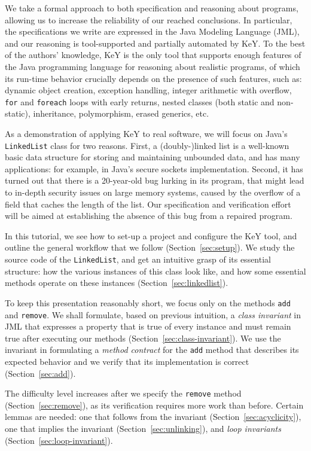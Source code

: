 \documentclass[runningheads]{llncs}
\begin{document}
We take a formal approach to both specification and reasoning about programs, allowing us to increase the reliability of our reached conclusions. In particular, the specifications we write are expressed in the Java Modeling Language (JML), and our reasoning is tool-supported and partially automated by KeY. To the best of the authors' knowledge, KeY is the only tool that supports enough features of the Java programming language for reasoning about realistic programs, of which its run-time behavior crucially depends on the presence of such features, such as: dynamic object creation, exception handling, integer arithmetic with overflow, \texttt{for} and \texttt{foreach} loops with early returns, nested classes (both static and non-static), inheritance, polymorphism, erased generics, etc.

As a demonstration of applying KeY to real software, we will focus on Java's \texttt{LinkedList} class for two reasons. First, a (doubly-)linked list is a well-known basic data structure for storing and maintaining unbounded data, and has many applications: for example, in Java's secure sockets implementation. Second, it has turned out that there is a 20-year-old bug lurking in its program, that might lead to in-depth security issues on large memory systems, caused by the overflow of a field that caches the length of the list. Our specification and verification effort will be aimed at establishing the absence of this bug from a repaired program.

In this tutorial, we see how to set-up a project and configure the KeY tool, and outline the general workflow that we follow (Section~\ref{sec:setup}). We study the source code of the \texttt{LinkedList}, and get an intuitive grasp of its essential structure: how the various instances of this class look like, and how some essential methods operate on these instances (Section~\ref{sec:linkedlist}).

To keep this presentation reasonably short, we focus only on the methods \texttt{add} and \texttt{remove}. We shall formulate, based on previous intuition, a \emph{class invariant} in JML that expresses a property that is true of every instance and must remain true after executing our methods (Section~\ref{sec:class-invariant}). We use the invariant in formulating a \emph{method contract} for the \texttt{add} method that describes its expected behavior and we verify that its implementation is correct (Section~\ref{sec:add}).

The difficulty level increases after we specify the \texttt{remove} method (Section~\ref{sec:remove}), as its verification requires more work than before. Certain lemmas are needed: one that follows from the invariant (Section~\ref{sec:acyclicity}), one that implies the invariant (Section~\ref{sec:unlinking}), and \emph{loop invariants} (Section~\ref{sec:loop-invariant}).
\end{document}
